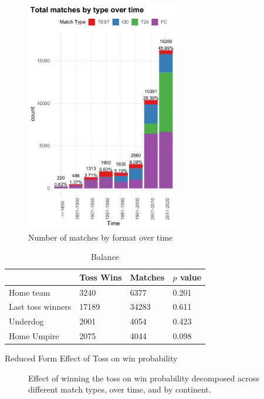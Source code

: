 \documentclass[11pt,  letterpaper]{article}
\begin{document}
\begin{figure}[tbh]
  \centering
  \includegraphics[width=0.6\textwidth,keepaspectratio]{output/matchcounts.pdf}
  \caption{Number of matches by format over time}
  \label{fig:timeseries_decomp}
\end{figure}


\begin{table}[b!]\centering
\begin{tabular}{llll}
 & Toss Wins & Matches & $p$ value\\ \hline
Home team & 3240 & 6377 & 0.201\\
Last toss winners & 17189 & 34283 & 0.611\\
Underdog & 2001 & 4054 & 0.423\\
Home Umpire &  2075	& 4044	& 0.098 \\
\end{tabular}
\caption{Balance \label{table: balance}}
\end{table}



\begin{table}
\centering
\caption{Reduced Form Effect of Toss on win probability}

\label{table:reduced_form}
\end{table}

\begin{figure}[b]
  \centering
  \caption{Effect of winning the toss on win probability decomposed across different
  match types, over time, and by continent.}
  \label{fig:rf_het_TE}
\end{figure}
\end{document}
